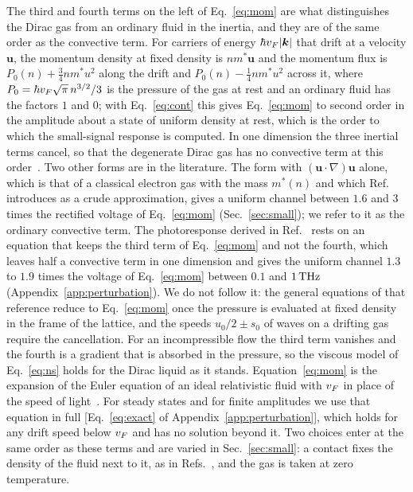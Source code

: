 The third and fourth terms on the left of Eq.~\eqref{eq:mom} are what
distinguishes the Dirac gas from an ordinary fluid in the inertia, and
they are of the same order as the convective term. For carriers of energy
$\hbar v_{F}|\bm{k}|$ that drift at a velocity $\bm{u}$, the momentum density
at fixed density is $n m^{*}\bm{u}$ and the momentum flux is
$P_{0}(n)+\tfrac34 n m^{*}u^{2}$ along the drift and
$P_{0}(n)-\tfrac14 n m^{*}u^{2}$ across it, where
$P_{0}=\hbar v_{F}\sqrt{\pi}\,n^{3/2}/3$ is the pressure of the gas at rest
and an ordinary fluid has
the factors $1$ and $0$; with Eq.~\eqref{eq:cont} this gives
Eq.~\eqref{eq:mom} to second order in the amplitude about a state of
uniform density at rest, which is the order to which the small-signal
response is computed. In one dimension the three
inertial terms cancel, so that the degenerate Dirac gas has no convective
term at
this order~\cite{svintsov2013hydrodynamic}. Two other forms are in the
literature. The form with
$(\bm{u}\cdot\nabla)\bm{u}$ alone, which is that of a classical electron
gas with the mass $m^{*}(n)$ and which Ref.~\cite{tomadin2013theory}
introduces as a crude approximation, gives a uniform channel between
$1.6$ and $3$ times the rectified voltage of Eq.~\eqref{eq:mom}
(Sec.~\ref{sec:small}); we refer to it as the ordinary convective term.
The photoresponse derived in Ref.~\cite{tomadin2013theory} rests on an
equation that keeps the third term of Eq.~\eqref{eq:mom} and not the
fourth, which leaves half a convective term in one dimension and gives
the uniform channel $1.3$ to $1.9$ times the voltage of
Eq.~\eqref{eq:mom} between $0.1$ and $1\,\mathrm{THz}$
(Appendix~\ref{app:perturbation}). We do not follow it: the general
equations of that reference reduce to Eq.~\eqref{eq:mom} once the pressure
is evaluated at fixed density in the frame of the lattice, and the speeds
$u_{0}/2\pm s_{0}$ of waves on a drifting
gas~\cite{svintsov2013hydrodynamic} require the cancellation. For an
incompressible flow the third term vanishes and the fourth is a gradient
that is absorbed in the pressure, so the viscous model of
Eq.~\eqref{eq:ns} holds for the Dirac liquid as it stands.
Equation~\eqref{eq:mom} is the expansion of the Euler equation of an
ideal relativistic fluid with $v_{F}$ in place of the speed of
light~\cite{landau1987fluid,tomadin2013theory}. For steady states and for
finite amplitudes we use that equation in full
[Eq.~\eqref{eq:exact} of Appendix~\ref{app:perturbation}], which holds for
any drift speed below $v_{F}$ and has no solution beyond it. Two choices
enter at the same order as these terms and are varied in
Sec.~\ref{sec:small}: a contact fixes the density of the fluid next to
it, as in
Refs.~\cite{dyakonov1993shallow,tomadin2013theory,svintsov2013hydrodynamic},
and the gas is taken at zero temperature.

